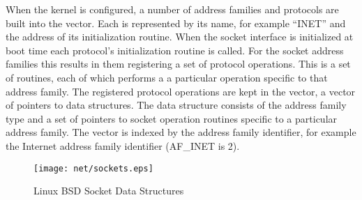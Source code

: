 When the kernel is configured, a number of address families and protocols are built into the 
 vector.
Each is represented by its name, for example ``INET'' and the address of its initialization routine.
When the socket interface is initialized at boot time each protocol's initialization routine is called.
For the socket address families this results in them registering a set of protocol operations.
This is a set of routines, each of which performs a a particular operation specific to that address
family.
The registered protocol operations are kept in the  vector, a vector
of pointers to  data structures.
The  data structure consists of the address family type and a set of pointers to socket
operation routines specific to a particular address family.
The  vector is indexed by the address family identifier, for example the Internet address 
family identifier (AF\_INET is 2).

\begin{figure}
\begin{center}
{\centering \texttt{[image: net/sockets.eps]} \par}
\end{center}
\caption{Linux BSD Socket Data Structures}
\label{sockets-figure}
\end{figure}

